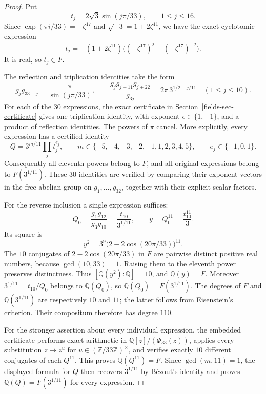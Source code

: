 \documentclass[11pt,a4paper]{article}
\theoremstyle{definition}
\theoremstyle{remark}
\numberwithin{equation}{section}
\begin{document}
\begin{proof}
Put
\[
 t_j=2\sqrt3\sin(j\pi/33),\qquad 1\leq j\leq16.
\]
Since $\exp(\pi i/33)=-\zeta^{17}$ and
$\sqrt{-3}=1+2\zeta^{11}$, we have the exact cyclotomic expression
\[
 t_j=-(1+2\zeta^{11})
 \bigl((-\zeta^{17})^j-(-\zeta^{17})^{-j}\bigr).
\]
It is real, so $t_j\in F$.

The reflection and triplication identities take the form
\[
 g_jg_{33-j}=\frac{\pi}{\sin(j\pi/33)},\qquad
 \frac{g_jg_{j+11}g_{j+22}}{g_{3j}}
   =2\pi\,3^{1/2-j/11}\quad(1\leq j\leq10).
\]
For each of the $30$ expressions, the exact certificate in Section~\ref{fields-sec-certificate}
gives one triplication identity, with exponent $\epsilon\in\{1,-1\}$,
and a product of reflection identities.  The powers of $\pi$ cancel.
More explicitly, every expression has a certified identity
\[
 Q=3^{m/11}\prod_jt_j^{e_j},
 \qquad m\in\{-5,-4,-3,-2,-1,1,2,3,4,5\},
 \qquad e_j\in\{-1,0,1\}.
\]
Consequently all eleventh powers belong to $F$, and all original
expressions belong to $F(3^{1/11})$.  These $30$ identities are verified
by comparing their exponent vectors in the free abelian group on
$g_1,\ldots,g_{32}$, together with their explicit scalar factors.

For the reverse inclusion a single expression suffices:
\[
 Q_0=\frac{g_1g_{12}}{g_3g_{10}}
     =\frac{t_{10}}{3^{1/11}},\qquad
 y=Q_0^{11}=\frac{t_{10}^{11}}3.
\]
Its square is
\[
 y^2=3^9\bigl(2-2\cos(20\pi/33)\bigr)^{11}.
\]
The $10$ conjugates of $2-2\cos(20\pi/33)$ in $F$ are pairwise distinct
positive real numbers, because $\gcd(10,33)=1$. Raising them to the
eleventh power preserves distinctness. Thus
$[\mathbb Q(y^2):\mathbb Q]=10$, and
$\mathbb Q(y)=F$.  Moreover $3^{1/11}=t_{10}/Q_0$ belongs to
$\mathbb Q(Q_0)$, so
$\mathbb Q(Q_0)=F(3^{1/11})$.  The degrees of $F$ and
$\mathbb Q(3^{1/11})$ are respectively $10$ and $11$; the latter follows
from Eisenstein's criterion.  Their compositum therefore has degree
$110$.

For the stronger assertion about every individual expression, the
embedded certificate performs exact arithmetic in
$\mathbb Q[z]/(\Phi_{33}(z))$, applies every substitution $z\mapsto z^u$
for $u\in(\mathbb Z/33\mathbb Z)^\times$, and verifies exactly $10$
different conjugates of each $Q^{11}$.  This proves
$\mathbb Q(Q^{11})=F$.  Since $\gcd(m,11)=1$, the displayed formula for
$Q$ then recovers $3^{1/11}$ by B\'ezout's identity and proves
$\mathbb Q(Q)=F(3^{1/11})$ for every expression.
\end{proof}
\end{document}
